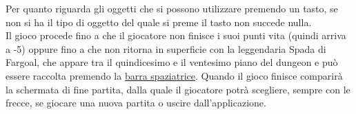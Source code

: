 \documentclass{report}
\begin{document}
%
Per quanto riguarda gli oggetti che si possono utilizzare premendo un tasto, se non si ha il tipo di oggetto del quale si preme il tasto non succede nulla.
%
\\
%
Il gioco procede fino a che il giocatore non finisce i suoi punti vita (quindi arriva a -5) oppure fino a che non ritorna in superficie con la leggendaria Spada di Fargoal, che appare tra il quindicesimo e il ventesimo piano del dungeon e può essere raccolta premendo la \underline{barra spaziatrice}.
%
Quando il gioco finisce comparirà la schermata di fine partita, dalla quale il giocatore potrà scegliere, sempre con le frecce, se giocare una nuova partita o uscire dall'applicazione.
\end{document}

